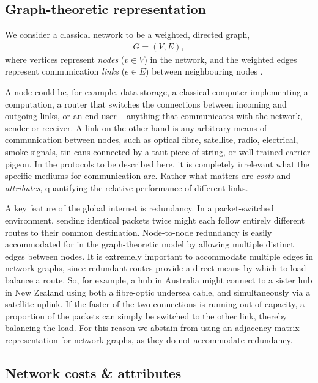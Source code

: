 \documentclass[aps, rmp, twocolumn, amsmath, amssymb, nofootinbib, superscriptaddress, longbibliography, floatfix, table-of-contents, eqsecnum]{revtex4-1}
\begin{document}
%
%

\subsection{Graph-theoretic representation} 

We consider a classical network to be a weighted, directed graph,
\begin{align}
	G=(V,E),
\end{align}
where vertices represent \textit{nodes} (\mbox{$v\in V$}) in the network, and the weighted edges represent communication \textit{links} (\mbox{$e\in E$}) between neighbouring nodes \cite{???}.

A node could be, for example, data storage, a classical computer implementing a computation, a router that switches the connections between incoming and outgoing links, or an end-user -- anything that communicates with the network, sender or receiver. A link on the other hand is any arbitrary means of communication between nodes, such as optical fibre, satellite, radio, electrical, smoke signals, tin cans connected by a taut piece of string, or well-trained carrier pigeon. In the protocols to be described here, it is completely irrelevant what the specific mediums for communication are. Rather what matters are \textit{costs} and \textit{attributes}, quantifying the relative performance of different links.

A key feature of the global internet is redundancy. In a packet-switched environment, sending identical packets twice might each follow entirely different routes to their common destination. Node-to-node redundancy is easily accommodated for in the graph-theoretic model by allowing multiple distinct edges between nodes. It is extremely important to accommodate multiple edges in network graphs, since redundant routes provide a direct means by which to load-balance a route. So, for example, a hub in Australia might connect to a sister hub in New Zealand using both a fibre-optic undersea cable, and simultaneously via a satellite uplink. If the faster of the two connections is running out of capacity, a proportion of the packets can simply be switched to the other link, thereby balancing the load. For this reason we abstain from using an adjacency matrix representation for network graphs, as they do not accommodate redundancy.

%
%

\subsection{Network costs \& attributes} \label{sec:costs} 
\end{document}
